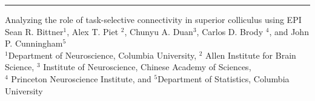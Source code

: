 \documentclass[landscape]{article}
\begin{document}
\color{black}

\hrule width 0pt depth 0pt height 1pt

\begin{center}
  \titleSize
Analyzing the role of task-selective connectivity in superior colliculus using EPI \\
  \HUGE %
  Sean R. Bittner$^{1}$, Alex T. Piet $^{2}$, Chunyu A. Duan$^{3}$, Carlos D. Brody $^{4}$, and John P. Cunningham$^5$ \\
\huge
 $^{1}$Department of Neuroscience, Columbia University, $^{2}$ Allen Institute for Brain Science, $^{3}$ Institute of Neuroscience, Chinese Academy of Sciences, \\ $^{4}$ Princeton Neuroscience Institute, and $^{5}$Department of Statistics, Columbia University
\end{center}

\end{document}
